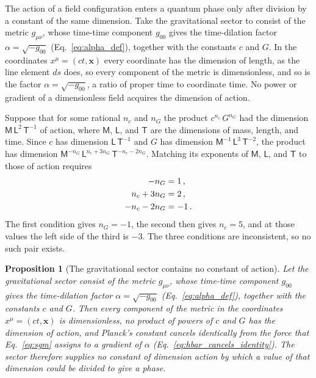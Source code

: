 \documentclass[aps,prd,onecolumn,tightenlines,nofootinbib,notitlepage,11pt,floatfix]{revtex4-2}
\theoremstyle{indentedtheorem}
\newtheorem{proposition}{Proposition}
\begin{document}
The action of a field configuration enters a quantum phase only after division by a constant of the same dimension. Take the gravitational sector to consist of the metric $g_{\mu\nu}$, whose time-time component $g_{00}$ gives the time-dilation factor $\alpha=\sqrt{-g_{00}}$ (Eq.~\eqref{eq:alpha_def}), together with the constants $c$ and $G$. In the coordinates $x^\mu=(ct,\mathbf{x})$ every coordinate has the dimension of length, as the line element $ds$ does, so every component of the metric is dimensionless, and so is the factor $\alpha=\sqrt{-g_{00}}$, a ratio of proper time to coordinate time. No power or gradient of a dimensionless field acquires the dimension of action.

Suppose that for some rational $n_c$ and $n_G$ the product $c^{n_c} \, G^{n_G}$ had the dimension $\mathsf{M} \, \mathsf{L}^2 \, \mathsf{T}^{-1}$ of action, where $\mathsf{M}$, $\mathsf{L}$, and $\mathsf{T}$ are the dimensions of mass, length, and time. Since $c$ has dimension $\mathsf{L} \, \mathsf{T}^{-1}$ and $G$ has dimension $\mathsf{M}^{-1} \, \mathsf{L}^3 \, \mathsf{T}^{-2}$, the product has dimension $\mathsf{M}^{-n_G} \, \mathsf{L}^{n_c+3n_G} \, \mathsf{T}^{-n_c-2n_G}$. Matching its exponents of $\mathsf{M}$, $\mathsf{L}$, and $\mathsf{T}$ to those of action requires
\begin{align}
    -n_G &= 1 \, , \notag\\
    n_c+3n_G &= 2 \, , \notag\\
    -n_c-2n_G &= -1 \, . \notag
\end{align}
The first condition gives $n_G=-1$, the second then gives $n_c=5$, and at those values the left side of the third is $-3$. The three conditions are inconsistent, so no such pair exists.

\begin{proposition}[The gravitational sector contains no constant of action]\label{prop:no_grav_action}
Let the gravitational sector consist of the metric $g_{\mu\nu}$, whose time-time component $g_{00}$ gives the time-dilation factor $\alpha=\sqrt{-g_{00}}$ (Eq.~\eqref{eq:alpha_def}), together with the constants $c$ and $G$. Then every component of the metric in the coordinates $x^\mu=(ct,\mathbf{x})$ is dimensionless, no product of powers of $c$ and $G$ has the dimension of action, and Planck's constant cancels identically from the force that Eq.~\eqref{eq:sgm} assigns to a gradient of $\alpha$ (Eq.~\eqref{eq:hbar_cancels_identity}). The sector therefore supplies no constant of dimension action by which a value of that dimension could be divided to give a phase.
\end{proposition}
\end{document}
